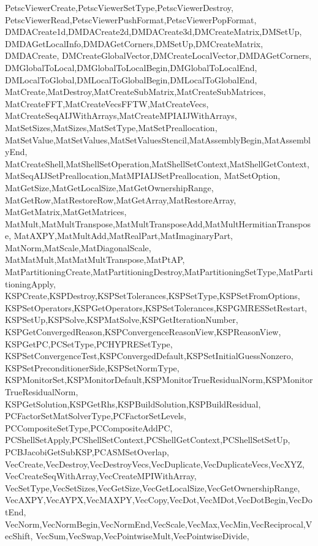 {{{{{    PetscViewerCreate,PetscViewerSetType,PetscViewerDestroy,
    PetscViewerRead,PetscViewerPushFormat,PetscViewerPopFormat,
    DMDACreate1d,DMDACreate2d,DMDACreate3d,DMCreateMatrix,DMSetUp,
    DMDAGetLocalInfo,DMDAGetCorners,DMSetUp,DMCreateMatrix,
    DMDACreate, %
    DMCreateGlobalVector,DMCreateLocalVector,DMDAGetCorners,
    DMGlobalToLocal,DMGlobalToLocalBegin,DMGlobalToLocalEnd,
    DMLocalToGlobal,DMLocalToGlobalBegin,DMLocalToGlobalEnd,
    MatCreate,MatDestroy,MatCreateSubMatrix,MatCreateSubMatrices,
    MatCreateFFT,MatCreateVecsFFTW,MatCreateVecs,
    MatCreateSeqAIJWithArrays,MatCreateMPIAIJWithArrays,
    MatSetSizes,MatSizes,MatSetType,MatSetPreallocation,
    MatSetValue,MatSetValues,MatSetValuesStencil,MatAssemblyBegin,MatAssemblyEnd,
    MatCreateShell,MatShellSetOperation,MatShellSetContext,MatShellGetContext,
    MatSeqAIJSetPreallocation,MatMPIAIJSetPreallocation,    
    MatSetOption,
    MatGetSize,MatGetLocalSize,MatGetOwnershipRange,
    MatGetRow,MatRestoreRow,MatGetArray,MatRestoreArray,
    MatGetMatrix,MatGetMatrices,
    MatMult,MatMultTranspose,MatMultTransposeAdd,MatMultHermitianTranspose,
    MatAXPY,MatMultAdd,MatRealPart,MatImaginaryPart,
    MatNorm,MatScale,MatDiagonalScale,
    MatMatMult,MatMatMultTranspose,MatPtAP,
    MatPartitioningCreate,MatPartitioningDestroy,MatPartitioningSetType,MatPartitioningApply,
    KSPCreate,KSPDestroy,KSPSetTolerances,KSPSetType,KSPSetFromOptions,
    KSPSetOperators,KSPGetOperators,KSPSetTolerances,KSPGMRESSetRestart,
    KSPSetUp,KSPSolve,KSPMatSolve,KSPGetIterationNumber,
    KSPGetConvergedReason,KSPConvergenceReasonView,KSPReasonView,
    KSPGetPC,PCSetType,PCHYPRESetType,
    KSPSetConvergenceTest,KSPConvergedDefault,KSPSetInitialGuessNonzero,
    KSPSetPreconditionerSide,KSPSetNormType,
    KSPMonitorSet,KSPMonitorDefault,KSPMonitorTrueResidualNorm,KSPMonitorTrueResidualNorm,
    KSPGetSolution,KSPGetRhs,KSPBuildSolution,KSPBuildResidual,
    PCFactorSetMatSolverType,PCFactorSetLevels,
    PCCompositeSetType,PCCompositeAddPC,
    PCShellSetApply,PCShellSetContext,PCShellGetContext,PCShellSetSetUp,
    PCBJacobiGetSubKSP,PCASMSetOverlap,
    VecCreate,VecDestroy,VecDestroyVecs,VecDuplicate,VecDuplicateVecs,VecXYZ,
    VecCreateSeqWithArray,VecCreateMPIWithArray,
    VecSetType,VecSetSizes,VecGetSize,VecGetLocalSize,VecGetOwnershipRange,
    VecAXPY,VecAYPX,VecMAXPY,VecCopy,VecDot,VecMDot,VecDotBegin,VecDotEnd,
    VecNorm,VecNormBegin,VecNormEnd,VecScale,VecMax,VecMin,VecReciprocal,VecShift,
    VecSum,VecSwap,VecPointwiseMult,VecPointwiseDivide,
}}}}}
